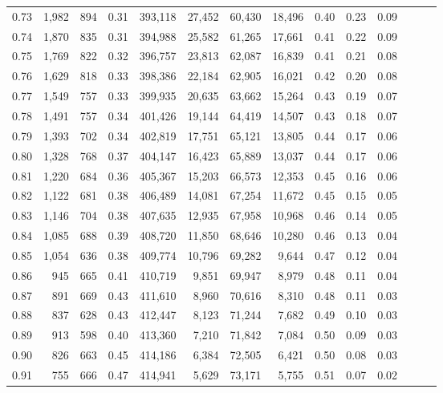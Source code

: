 \begin{tabular}{rrrrrrrrrrrrrr}
0.73 &  1,982 &    894 &  0.31 &  393,118 &   27,452 &  60,430 &  18,496 &  0.40 &  0.23 &      0.09 \\
0.74 &  1,870 &    835 &  0.31 &  394,988 &   25,582 &  61,265 &  17,661 &  0.41 &  0.22 &      0.09 \\
0.75 &  1,769 &    822 &  0.32 &  396,757 &   23,813 &  62,087 &  16,839 &  0.41 &  0.21 &      0.08 \\
0.76 &  1,629 &    818 &  0.33 &  398,386 &   22,184 &  62,905 &  16,021 &  0.42 &  0.20 &      0.08 \\
0.77 &  1,549 &    757 &  0.33 &  399,935 &   20,635 &  63,662 &  15,264 &  0.43 &  0.19 &      0.07 \\
0.78 &  1,491 &    757 &  0.34 &  401,426 &   19,144 &  64,419 &  14,507 &  0.43 &  0.18 &      0.07 \\
0.79 &  1,393 &    702 &  0.34 &  402,819 &   17,751 &  65,121 &  13,805 &  0.44 &  0.17 &      0.06 \\
0.80 &  1,328 &    768 &  0.37 &  404,147 &   16,423 &  65,889 &  13,037 &  0.44 &  0.17 &      0.06 \\
0.81 &  1,220 &    684 &  0.36 &  405,367 &   15,203 &  66,573 &  12,353 &  0.45 &  0.16 &      0.06 \\
0.82 &  1,122 &    681 &  0.38 &  406,489 &   14,081 &  67,254 &  11,672 &  0.45 &  0.15 &      0.05 \\
0.83 &  1,146 &    704 &  0.38 &  407,635 &   12,935 &  67,958 &  10,968 &  0.46 &  0.14 &      0.05 \\
0.84 &  1,085 &    688 &  0.39 &  408,720 &   11,850 &  68,646 &  10,280 &  0.46 &  0.13 &      0.04 \\
0.85 &  1,054 &    636 &  0.38 &  409,774 &   10,796 &  69,282 &   9,644 &  0.47 &  0.12 &      0.04 \\
0.86 &    945 &    665 &  0.41 &  410,719 &    9,851 &  69,947 &   8,979 &  0.48 &  0.11 &      0.04 \\
0.87 &    891 &    669 &  0.43 &  411,610 &    8,960 &  70,616 &   8,310 &  0.48 &  0.11 &      0.03 \\
0.88 &    837 &    628 &  0.43 &  412,447 &    8,123 &  71,244 &   7,682 &  0.49 &  0.10 &      0.03 \\
0.89 &    913 &    598 &  0.40 &  413,360 &    7,210 &  71,842 &   7,084 &  0.50 &  0.09 &      0.03 \\
0.90 &    826 &    663 &  0.45 &  414,186 &    6,384 &  72,505 &   6,421 &  0.50 &  0.08 &      0.03 \\
0.91 &    755 &    666 &  0.47 &  414,941 &    5,629 &  73,171 &   5,755 &  0.51 &  0.07 &      0.02 \\

\end{tabular}
